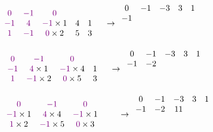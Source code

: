 \documentclass[11pt]{article}
\begin{document}
\[
\begin{array}{cccccccccc}
    \textcolor{violet}{0}&\textcolor{violet}{-1}& \textcolor{violet}{0}& &\\
    \textcolor{violet}{-1}&\textcolor{violet}{4}&\textcolor{violet}{-1}\times 1 &4&1& \\
    \textcolor{violet}{1}&\textcolor{violet}{-1}&\textcolor{violet}{0}\times 2 &5&3& \\ 
\end{array}
\rightarrow
\begin{array}{ccccc}
    0 & -1 & -3 & 3&1\\
    -1 &  &  & &  \\
     &  &  & &  \\
     &  &  & &  \\
\end{array}
\]
\[
\begin{array}{cccccccccc}
    &\textcolor{violet}{0}&\textcolor{violet}{-1}& \textcolor{violet}{0}& &\\
    &\textcolor{violet}{-1}&\textcolor{violet}{4}\times 1&\textcolor{violet}{-1}\times 4 &1& \\
    &\textcolor{violet}{1}&\textcolor{violet}{-1}\times 2&\textcolor{violet}{0}\times 5&3& \\ 
\end{array}
\rightarrow
\begin{array}{ccccc}
    0 & -1 & -3 & 3&1\\
    -1 & -2 &  & &  \\
     &  &  & &  \\
     &  &  & &  \\
\end{array}
\]
\[
\begin{array}{cccccccccc}
    &&\textcolor{violet}{0}&\textcolor{violet}{-1}& \textcolor{violet}{0}&\\
    &&\textcolor{violet}{-1}\times 1&\textcolor{violet}{4}\times 4&\textcolor{violet}{-1}\times 1&&\\
    &&\textcolor{violet}{1}\times 2&\textcolor{violet}{-1}\times 5&\textcolor{violet}{0}\times 3& \\ 
\end{array}
\rightarrow
\begin{array}{ccccc}
    0 & -1 & -3 & 3&1\\
    -1 & -2 & 11 & &  \\
     &  &  & &  \\
     &  &  & &  \\
\end{array}
\]
\end{document}
